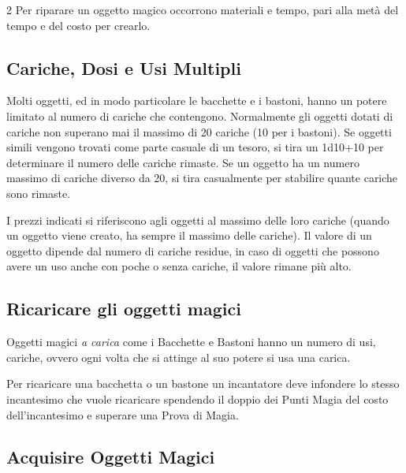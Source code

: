 \begin{multicols}{2}
Per riparare un oggetto magico occorrono materiali e tempo, pari alla metà del tempo e del costo per crearlo.

\subsection{Cariche, Dosi e Usi Multipli}

\label{cariche-dosi-e-usi-multipli}

Molti oggetti, ed in modo particolare le bacchette e i bastoni, hanno un potere limitato al numero di cariche che contengono. Normalmente gli oggetti dotati di cariche non superano mai il massimo di 20 cariche (10 per i bastoni). Se oggetti simili vengono trovati come parte casuale di un tesoro, si tira un 1d10+10 per determinare il numero delle cariche rimaste. Se un oggetto ha un numero massimo di cariche diverso da 20, si tira casualmente per stabilire quante cariche sono rimaste.

I prezzi indicati si riferiscono agli oggetti al massimo delle loro cariche (quando un oggetto viene creato, ha sempre il massimo delle cariche). Il valore di un oggetto dipende dal numero di cariche residue, in caso di oggetti che possono avere un uso anche con poche o senza cariche, il valore rimane più alto.

\subsection{Ricaricare gli oggetti magici}\label{Ricaricare gli oggetti magici}

Oggetti magici \emph{a carica} come i Bacchette e Bastoni hanno un numero di usi, cariche, ovvero ogni volta che si attinge al suo potere si usa una carica.

Per ricaricare una bacchetta o un bastone un incantatore deve infondere lo stesso incantesimo che vuole ricaricare spendendo il doppio dei Punti Magia del costo dell'incantesimo e superare una Prova di Magia.

\end{multicols}

\subsection{Acquisire Oggetti Magici}

\label{acquisire-oggetti-magici}

